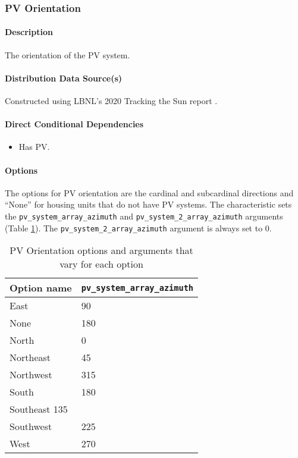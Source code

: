 \subsubsection{PV Orientation}  \label{sec:pv_orientation}
\paragraph{Description}
The orientation of the PV system.

\paragraph{Distribution Data Source(s)}
Constructed using LBNL's 2020 Tracking the Sun report \citep{LBNLTTS2019}.

\paragraph{Direct Conditional Dependencies}
\begin{itemize}
    \item Has PV.
\end{itemize}
\paragraph{Options}
The options for PV orientation are the cardinal and subcardinal directions and ``None'' for housing units that do not have PV systems. The characteristic sets the \texttt{pv\_system\_array\_azimuth} and \texttt{pv\_system\_2\_array\_azimuth} arguments (Table \ref{table:hc_opt_def_pv_orient}). The \texttt{pv\_system\_2\_array\_azimuth} argument is always set to 0.

\begin{longtable}[]{ |p{2.5cm}|p{6cm}| }
\caption{PV Orientation options and arguments that vary for each option} \label{table:hc_opt_def_pv_orient} \\
\toprule\noalign{}
Option name & \texttt{pv\_system\_array\_azimuth} \\
\midrule\noalign{}
\endhead
\bottomrule\noalign{}
\endlastfoot
East & 90 \\
None & 180 \\
North & 0 \\
Northeast & 45 \\
Northwest & 315 \\
South & 180 \\
Southeast 135 \\
Southwest & 225 \\
West & 270 \\
\end{longtable}

